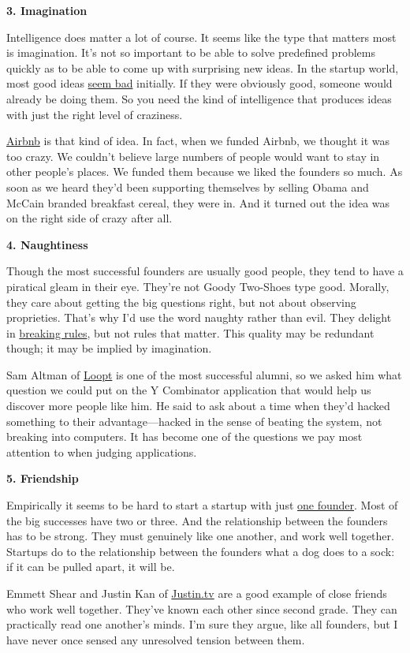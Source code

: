 \documentclass[12pt]{book}
\begin{document}
\textbf{3. Imagination}

Intelligence does matter a lot of course. It seems like the type that
matters most is imagination. It's not so important to be able to solve
predefined problems quickly as to be able to come up with surprising new
ideas. In the startup world, most good ideas \href{googles.html}{seem
bad} initially. If they were obviously good, someone would already be
doing them. So you need the kind of intelligence that produces ideas
with just the right level of craziness.

\href{http://airbnb.com}{Airbnb} is that kind of idea. In fact, when we
funded Airbnb, we thought it was too crazy. We couldn't believe large
numbers of people would want to stay in other people's places. We funded
them because we liked the founders so much. As soon as we heard they'd
been supporting themselves by selling Obama and McCain branded breakfast
cereal, they were in. And it turned out the idea was on the right side
of crazy after all.

\textbf{4. Naughtiness}

Though the most successful founders are usually good people, they tend
to have a piratical gleam in their eye. They're not Goody Two-Shoes type
good. Morally, they care about getting the big questions right, but not
about observing proprieties. That's why I'd use the word naughty rather
than evil. They delight in \href{gba.html}{breaking rules}, but not
rules that matter. This quality may be redundant though; it may be
implied by imagination.

Sam Altman of \href{http://loopt.com}{Loopt} is one of the most
successful alumni, so we asked him what question we could put on the Y
Combinator application that would help us discover more people like him.
He said to ask about a time when they'd hacked something to their
advantage---hacked in the sense of beating the system, not breaking into
computers. It has become one of the questions we pay most attention to
when judging applications.

\textbf{5. Friendship}

Empirically it seems to be hard to start a startup with just
\href{startupmistakes.html}{one founder}. Most of the big successes have
two or three. And the relationship between the founders has to be
strong. They must genuinely like one another, and work well together.
Startups do to the relationship between the founders what a dog does to
a sock: if it can be pulled apart, it will be.

Emmett Shear and Justin Kan of \href{http://justin.tv}{Justin.tv} are a
good example of close friends who work well together. They've known each
other since second grade. They can practically read one another's minds.
I'm sure they argue, like all founders, but I have never once sensed any
unresolved tension between them.
\end{document}
